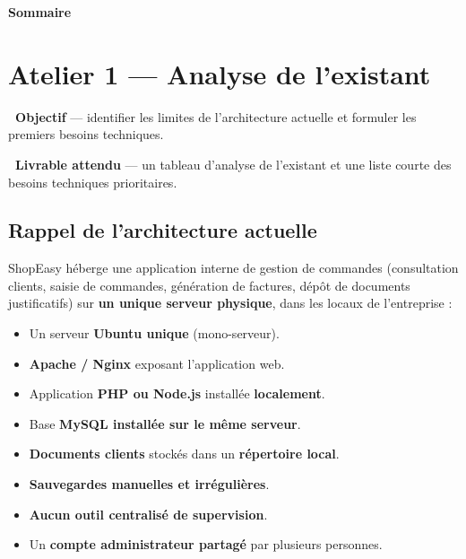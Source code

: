 \documentclass[11pt,a4paper]{article}
\newcommand{\emo}[1]{\raisebox{-0.14em}{\twemoji{#1}}}
\newcommand{\eTarget}{\emo{1f3af}}
\newcommand{\ePackage}{\emo{1f4e6}}
\begin{document}
\thispagestyle{fancy}
{\sffamily\Huge\bfseries\color{azuredark}Sommaire}
\vspace{2mm}{\color{azure}\titlerule[1.6pt]}\vspace{4mm}
\hypersetup{linkcolor=azuredark}
{\setlength{\parskip}{1pt}\tableofcontents}
\newpage


\section{Atelier 1 — Analyse de l'existant}

\begin{fiche}
\textbf{\eTarget~Objectif} — identifier les limites de l'architecture actuelle et formuler les premiers besoins techniques.

\textbf{\ePackage~Livrable attendu} — un tableau d'analyse de l'existant et une liste courte des besoins techniques prioritaires.
\end{fiche}

\subsection{Rappel de l'architecture actuelle}
ShopEasy héberge une application interne de gestion de commandes (consultation clients, saisie de commandes,
génération de factures, dépôt de documents justificatifs) sur \textbf{un unique serveur physique}, dans les
locaux de l'entreprise :
\begin{itemize}
  \item Un serveur \textbf{Ubuntu unique} (mono-serveur).
  \item \textbf{Apache / Nginx} exposant l'application web.
  \item Application \textbf{PHP ou Node.js} installée \textbf{localement}.
  \item Base \textbf{MySQL installée sur le même serveur}.
  \item \textbf{Documents clients} stockés dans un \textbf{répertoire local}.
  \item \textbf{Sauvegardes manuelles et irrégulières}.
  \item \textbf{Aucun outil centralisé de supervision}.
  \item Un \textbf{compte administrateur partagé} par plusieurs personnes.
\end{itemize}
\end{document}
